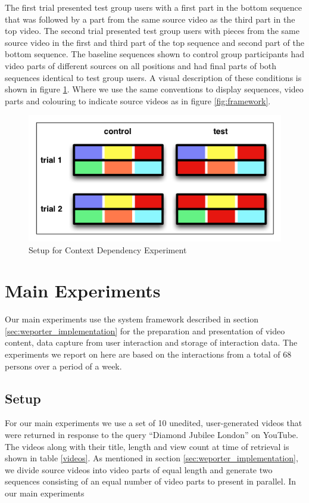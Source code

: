 The first trial presented test group users with a first part in the bottom sequence that was followed by a part from the same source video as the third part in the top video. The second trial presented test group users with pieces from the same source video in the first and third part of the top sequence and second part of the bottom sequence. The baseline sequences shown to control group participants had video parts of different sources on all positions and had final parts of both sequences identical to test group users. A visual description of these conditions is shown in figure \ref{fig:exp_context}. Where we use the same conventions to display sequences, video parts and colouring to indicate source videos as in figure \ref{fig:framework}.

\begin{figure}[htbp]
  \centering
    \includegraphics[width = .7\textwidth]{img/exp_context}
  \caption{Setup for Context Dependency Experiment}
  \label{fig:exp_context}
\end{figure}





\section{Main Experiments} %
\label{sec:main_experiments}

Our main experiments use the system framework described in section \ref{sec:weporter_implementation} for the preparation and presentation of video content, data capture from user interaction and storage of interaction data. The experiments we report on here are based on the interactions from a total of 68 persons over a period of a week.

\subsection{Setup}
For our main experiments we use a set of 10 unedited, user-generated videos that were returned in response to the query ``Diamond Jubilee London'' on YouTube. The videos along with their title, length and view count at time of retrieval is shown in table \ref{videos}. As mentioned in section \ref{sec:weporter_implementation}, we divide source videos into video parts of equal length and generate two sequences consisting of an equal number of video parts to present in parallel. In our main experiments 

